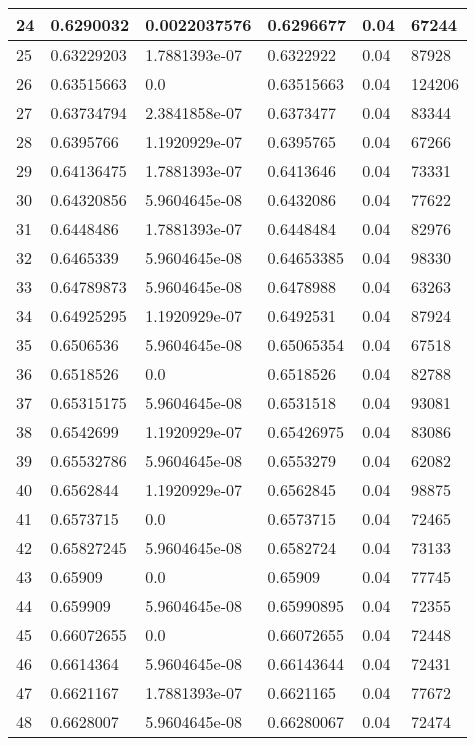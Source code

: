 \begin{longtable}{|l|l|l|l|l|l|}
24 & 0.6290032 & 0.0022037576 & 0.6296677 & 0.04 & 67244 \\ \hline 
25 & 0.63229203 & 1.7881393e-07 & 0.6322922 & 0.04 & 87928 \\ \hline 
26 & 0.63515663 & 0.0 & 0.63515663 & 0.04 & 124206 \\ \hline 
27 & 0.63734794 & 2.3841858e-07 & 0.6373477 & 0.04 & 83344 \\ \hline 
28 & 0.6395766 & 1.1920929e-07 & 0.6395765 & 0.04 & 67266 \\ \hline 
29 & 0.64136475 & 1.7881393e-07 & 0.6413646 & 0.04 & 73331 \\ \hline 
30 & 0.64320856 & 5.9604645e-08 & 0.6432086 & 0.04 & 77622 \\ \hline 
31 & 0.6448486 & 1.7881393e-07 & 0.6448484 & 0.04 & 82976 \\ \hline 
32 & 0.6465339 & 5.9604645e-08 & 0.64653385 & 0.04 & 98330 \\ \hline 
33 & 0.64789873 & 5.9604645e-08 & 0.6478988 & 0.04 & 63263 \\ \hline 
34 & 0.64925295 & 1.1920929e-07 & 0.6492531 & 0.04 & 87924 \\ \hline 
35 & 0.6506536 & 5.9604645e-08 & 0.65065354 & 0.04 & 67518 \\ \hline 
36 & 0.6518526 & 0.0 & 0.6518526 & 0.04 & 82788 \\ \hline 
37 & 0.65315175 & 5.9604645e-08 & 0.6531518 & 0.04 & 93081 \\ \hline 
38 & 0.6542699 & 1.1920929e-07 & 0.65426975 & 0.04 & 83086 \\ \hline 
39 & 0.65532786 & 5.9604645e-08 & 0.6553279 & 0.04 & 62082 \\ \hline 
40 & 0.6562844 & 1.1920929e-07 & 0.6562845 & 0.04 & 98875 \\ \hline 
41 & 0.6573715 & 0.0 & 0.6573715 & 0.04 & 72465 \\ \hline 
42 & 0.65827245 & 5.9604645e-08 & 0.6582724 & 0.04 & 73133 \\ \hline 
43 & 0.65909 & 0.0 & 0.65909 & 0.04 & 77745 \\ \hline 
44 & 0.659909 & 5.9604645e-08 & 0.65990895 & 0.04 & 72355 \\ \hline 
45 & 0.66072655 & 0.0 & 0.66072655 & 0.04 & 72448 \\ \hline 
46 & 0.6614364 & 5.9604645e-08 & 0.66143644 & 0.04 & 72431 \\ \hline 
47 & 0.6621167 & 1.7881393e-07 & 0.6621165 & 0.04 & 77672 \\ \hline 
48 & 0.6628007 & 5.9604645e-08 & 0.66280067 & 0.04 & 72474 \\ \hline 

\end{longtable}
